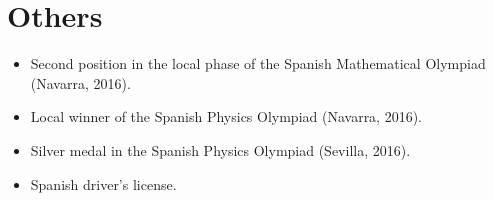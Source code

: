 \documentclass{article}
\begin{document}
\section*{Others}

\begin{itemize}
  \item Second position in the local phase of the Spanish Mathematical Olympiad
  (Navarra, 2016).
  \item Local winner of the Spanish Physics Olympiad (Navarra, 2016).
  \item Silver medal in the Spanish Physics Olympiad (Sevilla, 2016).
  \item Spanish driver's license.
\end{itemize}
\end{document}
